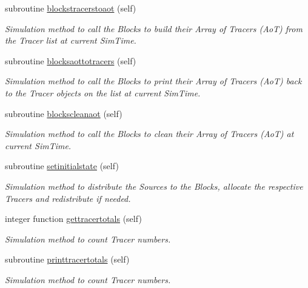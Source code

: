 \begin{DoxyCompactItemize}
subroutine \mbox{\hyperlink{namespacesimulation__mod_a624d5b402a8d359219839841862ab307}{blockstracerstoaot}} (self)
\begin{DoxyCompactList}\small\item\em Simulation method to call the Blocks to build their Array of Tracers (AoT) from the Tracer list at current Sim\+Time. \end{DoxyCompactList}\item 
subroutine \mbox{\hyperlink{namespacesimulation__mod_a03afd8682d3239c0ce8eb1637e4da806}{blocksaottotracers}} (self)
\begin{DoxyCompactList}\small\item\em Simulation method to call the Blocks to print their Array of Tracers (AoT) back to the Tracer objects on the list at current Sim\+Time. \end{DoxyCompactList}\item 
subroutine \mbox{\hyperlink{namespacesimulation__mod_a9c7e093e5cf65d3414f9a8cf8beab611}{blockscleanaot}} (self)
\begin{DoxyCompactList}\small\item\em Simulation method to call the Blocks to clean their Array of Tracers (AoT) at current Sim\+Time. \end{DoxyCompactList}\item 
subroutine \mbox{\hyperlink{namespacesimulation__mod_a447c6d709de6aa360a65d39d660e627b}{setinitialstate}} (self)
\begin{DoxyCompactList}\small\item\em Simulation method to distribute the Sources to the Blocks, allocate the respective Tracers and redistribute if needed. \end{DoxyCompactList}\item 
integer function \mbox{\hyperlink{namespacesimulation__mod_a0ad485eab624ffa4df282f1da8d9f214}{gettracertotals}} (self)
\begin{DoxyCompactList}\small\item\em Simulation method to count Tracer numbers. \end{DoxyCompactList}\item 
subroutine \mbox{\hyperlink{namespacesimulation__mod_aba126a8e0575cabb3bef6ab395002b3c}{printtracertotals}} (self)
\begin{DoxyCompactList}\small\item\em Simulation method to count Tracer numbers. \end{DoxyCompactList}\item 

\end{DoxyCompactItemize}
